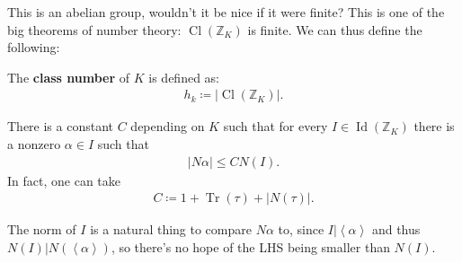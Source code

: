 \begin{remark}

This is an abelian group, wouldn't it be nice if it were finite? This is
one of the big theorems of number theory:
\(\operatorname{Cl}({\mathbb{Z}}_K)\) is finite. We can thus define the
following:

\end{remark}

\begin{definition}

The \textbf{class number} of \(K\) is defined as:
\begin{align*}
h_k \coloneqq{\left\lvert { \operatorname{Cl}({\mathbb{Z}}_K) } \right\rvert}
.\end{align*}

\end{definition}

\begin{lemma}

There is a constant \(C\) depending on \(K\) such that for every
\(I \in \operatorname{Id}({\mathbb{Z}}_K)\) there is a nonzero
\(\alpha\in I\) such that
\begin{align*}
{\left\lvert {N \alpha} \right\rvert}\leq C N(I) 
.\end{align*}
In fact, one can take
\begin{align*}
C \coloneqq 1 + \operatorname{Tr}(\tau) + {\left\lvert {N(\tau)} \right\rvert} 
.\end{align*}

\end{lemma}

\begin{remark}

The norm of \(I\) is a natural thing to compare \(N \alpha\) to, since
\(I \mathrel{\Big|}\left\langle{ \alpha }\right\rangle\) and thus
\(N(I) \mathrel{\Big|}N(\left\langle{ \alpha }\right\rangle)\), so
there's no hope of the LHS being smaller than \(N(I)\).

\end{remark}

